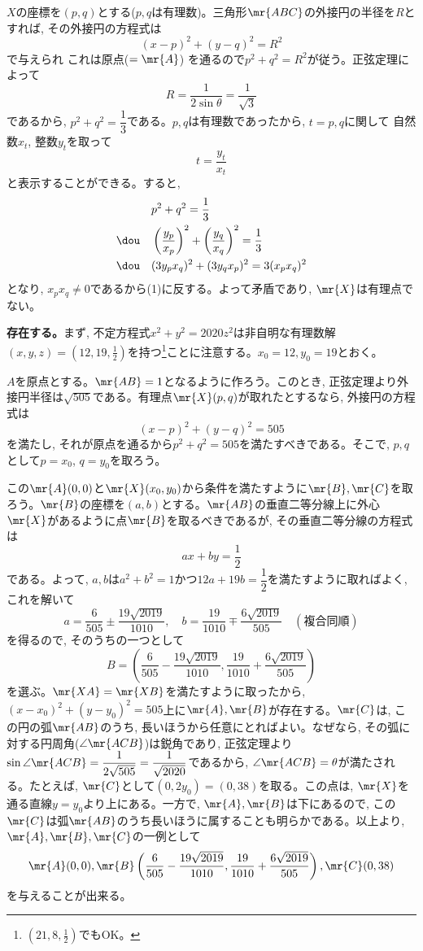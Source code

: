$X$の座標を$(p,q)$とする($p,q$は有理数)。三角形$\mr{ABC}$の外接円の半径を$R$とすれば, その外接円の方程式は
\[(x-p)^2 + (y-q)^2 = R^2\]
で与えられ これは原点($=\mr{A}$) を通るので$p^2 + q^2 = R^2$が従う。正弦定理によって
\[R = \dfrac{1}{2\sin{\theta}} = \dfrac{1}{\sqrt{3}}\]
であるから, $p^2 + q^2 = \dfrac{1}{3}$である。$p,q$は有理数であったから, $t=p,q$に関して 自然数$x_t$, 整数$y_t$を取って
\[t = \dfrac{y_t}{x_t}\]
と表示することができる。すると, 
\begin{align*}
 & p^2+q^2 = \dfrac{1}{3} \\
 \dou\quad & \left(\frac{y_p}{x_p}\right)^2 + \left(\frac{y_q}{x_q}\right)^2 = \dfrac{1}{3}\\
 \dou\quad & (3y_px_q)^2 + (3y_qx_p)^2 = 3(x_px_q)^2
\end{align*}
となり, $x_px_q \neq 0$であるから(1)に反する。よって矛盾であり, $\mr{X}$は有理点でない。

{\bf 存在する。}まず, 不定方程式$x^2 + y^2 = 2020z^2$は非自明な有理数解$(x,y,z) = (12,19,\frac{1}{2})$を持つ\footnote{$(21,8,\frac{1}{2})$でもOK。}ことに注意する。$x_0=12, y_0=19$とおく。

$A$を原点とする。$\mr{AB} = 1$となるように作ろう。このとき, 正弦定理より外接円半径は$\sqrt{505}$である。有理点$\mr{X}(p,q)$が取れたとするなら, 外接円の方程式は
\[(x-p)^2 + (y-q)^2 = 505\]
を満たし, それが原点を通るから$p^2 + q^2 = 505$を満たすべきである。そこで, $p,q$として$p=x_0$, $q=y_0$を取ろう。

この$\mr{A}(0,0)$と$\mr{X}(x_0,y_0)$から条件を満たすように$\mr{B},\mr{C}$を取ろう。$\mr{B}$の座標を$(a,b)$とする。$\mr{AB}$の垂直二等分線上に外心$\mr{X}$があるように点$\mr{B}$を取るべきであるが, その垂直二等分線の方程式は
\[ax+by = \dfrac{1}{2}\]
である。よって, $a,b$は$a^2 + b^2 = 1$かつ$12a + 19b=\dfrac{1}{2}$を満たすように取ればよく, これを解いて
\[a= \frac{6}{505} \pm \frac{19\sqrt{2019}}{1010},\quad b=\frac{19}{1010}\mp \frac{6\sqrt{2019}}{505}\quad (複合同順)\]
を得るので, そのうちの一つとして
\[B = \left(\frac{6}{505} - \frac{19\sqrt{2019}}{1010},\frac{19}{1010}+ \frac{6\sqrt{2019}}{505}\right) \]
を選ぶ。$\mr{XA} = \mr{XB}$を満たすように取ったから, $(x-x_0)^2 + (y-y_0)^2 = 505$上に$\mr{A},\mr{B}$が存在する。$\mr{C}$は, この円の弧$\mr{AB}$のうち, 長いほうから任意にとればよい。なぜなら, その弧に対する円周角($\angle{\mr{ACB}}$)は鋭角であり, 正弦定理より$\sin{\angle{\mr{ACB}}} = \dfrac{1}{2\sqrt{505}} =\dfrac{1}{\sqrt{2020}}$であるから, $\angle{\mr{ACB}} = \theta$が満たされる。たとえば, $\mr{C}$として$(0,2y_0) = (0,38)$を取る。この点は, $\mr{X}$を通る直線$y=y_0$より上にある。一方で, $\mr{A},\mr{B}$は下にあるので, この$\mr{C}$は弧$\mr{AB}$のうち長いほうに属することも明らかである。以上より, $\mr{A},\mr{B},\mr{C}$の一例として
\[ \mr{A}(0,0), \mr{B}\left(\dfrac{6}{505} - \dfrac{19\sqrt{2019}}{1010},\dfrac{19}{1010}+ \dfrac{6\sqrt{2019}}{505}\right), \mr{C}(0,38)\]
を与えることが出来る。

